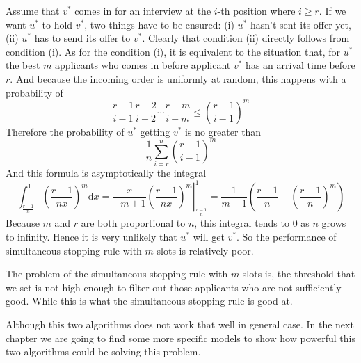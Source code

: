 Assume that $v^*$ comes in for an interview at the $i$-th position where
$i \ge r$. If we want $u^*$ to hold $v^*$, two things have to be ensured:
(i) $u^*$ hasn't sent its offer yet, (ii) $u^*$ has to send its offer to
$v^*$. Clearly that condition (ii) directly follows from condition (i).
As for the condition (i), it is equivalent to the situation that, for $u^*$
the best $m$ applicants who comes in before applicant $v^*$ 
has an arrival time before $r$.
And because the incoming order is uniformly at random,
this happens with a probability of
$$\frac{r - 1}{i - 1} \frac{r - 2}{i - 2} \cdots \frac{r - m}{i - m}
\le \left(\frac{r - 1}{i - 1}\right)^m$$
Therefore the probability of $u^*$ getting $v^*$ is no greater than
$$\frac{1}{n}\sum_{i = r}^{n} \left(\frac{r - 1}{i - 1}\right)^m$$
And this formula is asymptotically the integral
$$\int_{\frac{r - 1}{n}}^{1} \left(\frac{r - 1}{nx}\right)^m \mathrm{d}x
= \frac{x}{- m + 1} \left.\left(\frac{r-1}{nx}\right)^{m} \right|_{\frac{r-1}{n}}^{1}
= \frac{1}{m - 1} \left( \frac{r - 1}{n} - \left(\frac{r - 1}{n}\right)^m\right)$$
Because $m$ and $r$ are both proportional to $n$, this integral tends
to 0 as $n$ grows to infinity.
Hence it is very unlikely that $u^*$ will get $v^*$.
So the performance of simultaneous stopping rule with $m$ slots is
relatively poor.

The problem of the simultaneous stopping rule with $m$ slots is, 
the threshold that we set is not high enough to filter out 
those applicants who are not sufficiently good. While this is what
the simultaneous stopping rule is good at.

Although this two algorithms does not work that well in general case.
In the next chapter we are going to find some more specific models to
show how powerful this two algorithms could be solving this problem.
